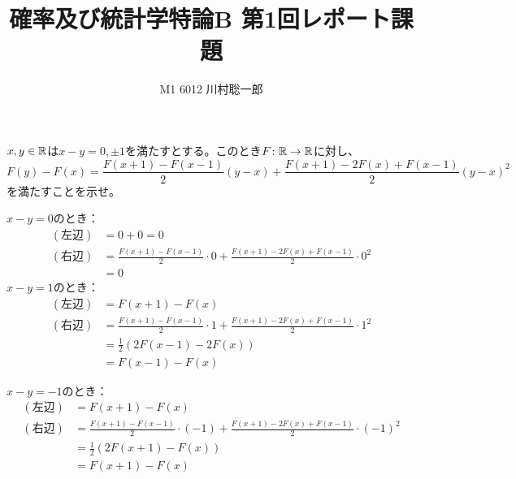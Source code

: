 \documentclass[dvipdfmx]{jsreport}
\title{確率及び統計学特論B 第1回レポート課題}
\author{M1 6012 川村聡一郎}
\date{}
\begin{document}
\maketitle

\begin{tcolorbox}
	$x, y\in \mathbb{R}$は$x- y= 0, \pm 1$を満たすとする。このとき$F\colon \mathbb{R}\to \mathbb{R}$に対し、
\begin{equation}
	F(y)- F(x)= \frac{F(x+ 1)- F(x- 1)}{2}(y- x)+ \frac{F(x+ 1)- 2F(x)+ F(x- 1)}{2}(y- x)^2
\end{equation}
	を満たすことを示せ。
\end{tcolorbox}

\begin{souanswer} %
	$x- y= 0$のとき：
\begin{align*}
	(左辺)&= 0+ 0= 0\\
	(右辺)
	&= \frac{F(x+ 1)- F(x- 1)}{2}\cdot 0+ \frac{F(x+ 1)- 2F(x)+ F(x- 1)}{2}\cdot 0^2\\
	&= 0
\end{align*}
	$x- y= 1$のとき：
\begin{align*}
	(左辺)&= F(x+ 1)- F(x)\\
	(右辺)
	&= \frac{F(x+ 1)- F(x- 1)}{2}\cdot 1+ \frac{F(x+ 1)- 2F(x)+ F(x- 1)}{2}\cdot 1^2\\
	&= \frac{1}{2}\left(2F(x- 1)- 2F(x)\right)\\
	&= F(x- 1)- F(x)
\end{align*}
	
	$x- y= -1$のとき：
\begin{align*}
	(左辺)&= F(x+1)- F(x)\\
	(右辺)
	&= \frac{F(x+ 1)- F(x- 1)}{2}\cdot (-1)+ \frac{F(x+ 1)- 2F(x)+ F(x- 1)}{2}\cdot (-1)^2\\
	&= \frac{1}{2}\left(2F(x+ 1)- F(x)\right)\\
	&= F(x+ 1)- F(x)
\end{align*}
	



\end{souanswer}
\end{document}
